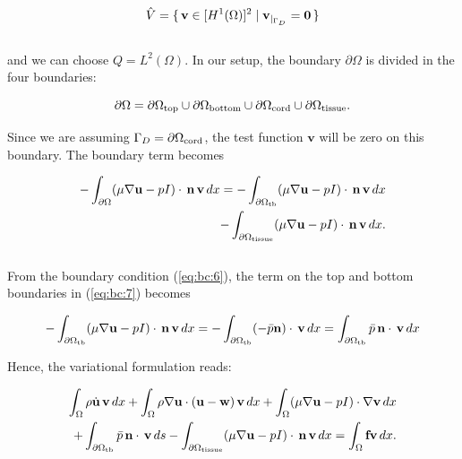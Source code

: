 \documentclass[11pt,a4paper,titlepage]{report}
\begin{document}
\begin{equation}
\hat{V} = \set{\mathbf{v} \in [H^1(\Omega)]^2 | \mathbf{v}_{|_{\Gamma_D}} = \mathbf{0}} 
\end{equation}
\\
and we can choose $Q = L^2(\Omega)$. In our setup, the boundary $\partial \Omega$ is divided in the four boundaries:

\begin{equation}
\partial \Omega= \partial \Omega_{\rm top} \cup
\partial \Omega_{\rm bottom} \cup
\partial \Omega_{\rm cord} \cup
\partial \Omega_{\rm tissue}.
\end{equation}

Since we are assuming $\Gamma_D = \partial \Omega_{\rm cord}$, the test function $\mathbf{v}$ will be zero on this boundary. The boundary term becomes

\begin{equation}
\label{eq:bc:7}
\begin{split}
- \int_{\partial \Omega} (\mu \nabla \mathbf{u} - p I) \cdot \, \mathbf{n} \, \mathbf{v} \, dx =
-\int_{\partial \Omega_{\rm tb}} (\mu \nabla \mathbf{u} - p I) \cdot \, \mathbf{n} \, \mathbf{v} \, dx \\
- \int_{\partial \Omega_{\rm tissue}} (\mu \nabla \mathbf{u} - p I) \cdot \, \mathbf{n} \, \mathbf{v} \, dx.
\end{split}
\end{equation}
\\

From the boundary condition (\ref{eq:bc:6}), the term on the top and bottom boundaries in (\ref{eq:bc:7}) becomes

\begin{equation}
- \int_{\partial \Omega_{\rm tb}} (\mu \nabla \mathbf{u} - p I) \cdot \, \mathbf{n} \, \mathbf{v} \, dx = 
- \int_{\partial \Omega_{\rm tb}} (-\bar{p} \mathbf{n}) \cdot \, \mathbf{v} \, dx = 
\int_{\partial \Omega_{\rm tb}} \bar{p} \, \mathbf{n} \cdot \, \mathbf{v} \, dx
\end{equation}

Hence, the variational formulation reads:

\begin{equation}
\label{eq:ns:5}
\begin{split}
\int_{\Omega} \rho \dot{\mathbf{u}} \, \mathbf{v} \, dx
+ \int_{\Omega} \rho \nabla \mathbf{u} \cdot (\mathbf{u} - \mathbf{w}) \, \mathbf{v} \, dx
+ \int_{\Omega} (\mu \nabla \mathbf{u} - pI) \cdot \nabla \mathbf{v} \, dx \\
+ \int_{\partial \Omega_{\rm tb}} \bar{p} \, \mathbf{n} \cdot \, \mathbf{v} \, ds
- \int_{\partial \Omega_{\rm tissue}} (\mu \nabla \mathbf{u} - p I) \cdot \, \mathbf{n} \, \mathbf{v} \, dx
=  \int_{\Omega} \mathbf{f} \mathbf{v} \, dx.
\end{split}
\end{equation}
\end{document}
